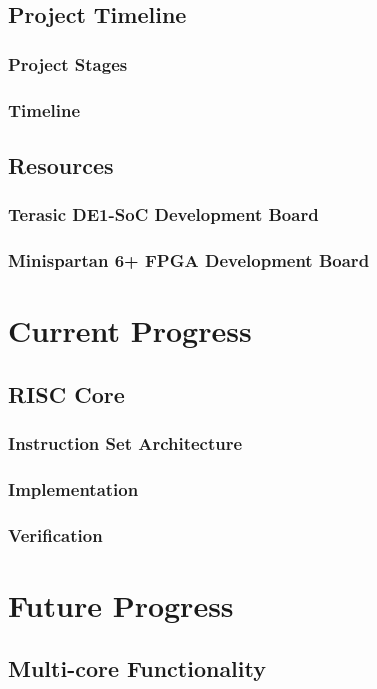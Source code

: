 \documentclass[11pt,a4paper,twoside]{report}
\begin{document}
\section{Project Timeline}
\subsection{Project Stages}
\subsection{Timeline}

\section{Resources}
\subsection{Terasic DE1-SoC Development Board}
\subsection{Minispartan 6+ FPGA Development Board}

\chapter{Current Progress}
\section{RISC Core}
\subsection{Instruction Set Architecture}
\subsection{Implementation}
\subsection{Verification}

\chapter{Future Progress}
\section{Multi-core Functionality}
\end{document}
